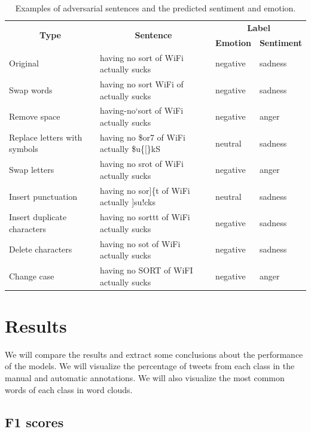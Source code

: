 \documentclass[11pt,a4paper]{article}
\begin{document}
\begin{table}[ht]
\centering
\begin{tabular}{llll}
\hline
\multicolumn{1}{c}{\multirow{2}{*}{\textbf{Type}}} & \multicolumn{1}{c}{\multirow{2}{*}{\textbf{Sentence}}} & \multicolumn{2}{c}{\textbf{Label}} \\ \cline{3-4} 
\multicolumn{1}{c}{} & \multicolumn{1}{c}{} & \multicolumn{1}{c}{\textbf{Emotion}} & \multicolumn{1}{c}{\textbf{Sentiment}} \\ \hline
Original & having no sort of WiFi actually sucks & negative & sadness \\
Swap words & having no sort WiFi of actually sucks & negative & sadness \\
Remove space & having-no`sort of WiFi actually sucks & negative & anger \\
Replace letters with symbols & having no \$or7 of WiFi actually \$u\{[\}kS & neutral & sadness \\
Swap letters & having no srot of WiFi actually sucks & negative & anger \\
Insert punctuation & having no sor{]}\{t of WiFi actually {]}su!cks & neutral & sadness \\
Insert duplicate characters & having no sorttt of WiFi actually sucks & negative & sadness \\
Delete characters & having no sot of WiFi actually sucks & negative & sadness \\
Change case & having no SORT of WiFI actually sucks & negative & anger \\ \hline
\end{tabular}
\caption{Examples of adversarial sentences and the predicted sentiment and emotion.}
\label{tab:adversarial}
\end{table}

\section{Results}

We will compare the results and extract some conclusions about the performance of the models. We will visualize the percentage of tweets from each class in the manual and automatic annotations. We will also visualize the most common words of each class in word clouds.

\subsection{F1 scores}
\end{document}
